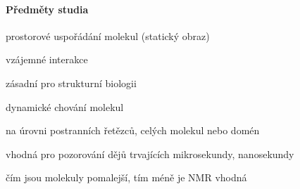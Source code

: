 \documentclass[DIV=8]{scrreprt}
\begin{document}
\paragraph{Předměty studia}
\begin{myItemize}[nosep]
    \item prostorové uspořádání molekul (statický obraz)
    \item vzájemné interakce
\begin{myItemize}[nosep]
    \item zásadní pro strukturní biologii
\end{myItemize}

    \item dynamické chování molekul
\begin{myItemize}[nosep]
    \item na úrovni postranních řetězců, celých molekul nebo domén
    \item vhodná pro pozorování dějů trvajících mikrosekundy, nanosekundy
\begin{myItemize}[nosep]
    \item čím jsou molekuly pomalejší, tím méně je NMR vhodná
\end{myItemize}

\end{myItemize}

\end{myItemize}
\end{document}
